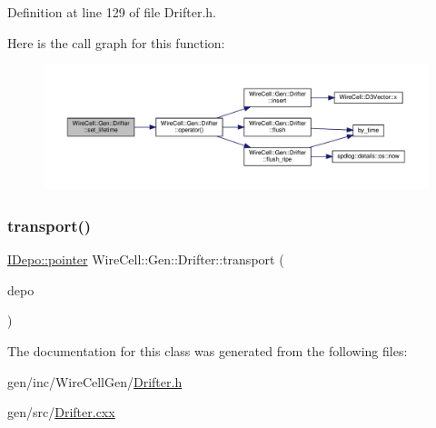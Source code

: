 Definition at line 129 of file Drifter.\+h.

Here is the call graph for this function\+:
\nopagebreak
\begin{figure}[H]
\begin{center}
\leavevmode
\includegraphics[width=350pt]{class_wire_cell_1_1_gen_1_1_drifter_a6ddb93888f24726d2e261a328c1b4164_cgraph}
\end{center}
\end{figure}
\mbox{\label{class_wire_cell_1_1_gen_1_1_drifter_a15c92059fc878922af5bbede346ff04f}} 
\subsubsection{\texorpdfstring{transport()}{transport()}}
{\footnotesize\ttfamily \hyperlink{class_wire_cell_1_1_i_data_aff870b3ae8333cf9265941eef62498bc}{I\+Depo\+::pointer} Wire\+Cell\+::\+Gen\+::\+Drifter\+::transport (\begin{DoxyParamCaption}\item[{\hyperlink{class_wire_cell_1_1_i_data_aff870b3ae8333cf9265941eef62498bc}{I\+Depo\+::pointer}}]{depo }\end{DoxyParamCaption})}



The documentation for this class was generated from the following files\+:\begin{DoxyCompactItemize}
\item 
gen/inc/\+Wire\+Cell\+Gen/\hyperlink{_drifter_8h}{Drifter.\+h}\item 
gen/src/\hyperlink{_drifter_8cxx}{Drifter.\+cxx}\end{DoxyCompactItemize}
